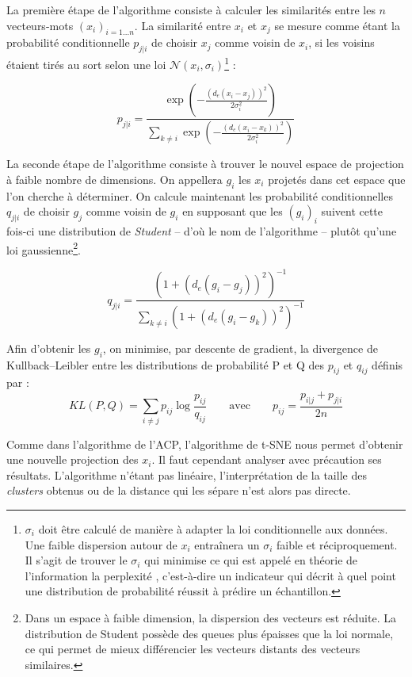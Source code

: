 \documentclass[11pt,french,french]{article}
\let\rmarkdownfootnote\footnote%
\def\footnote{\protect\rmarkdownfootnote}
\begin{document}
La première étape de l'algorithme consiste à calculer les similarités entre les \(n\) vecteurs-mots \((x_i)_{i=1...n}\). La similarité entre \(x_i\) et \(x_j\) se mesure comme étant la probabilité conditionnelle \(p_{j|i}\) de choisir \(x_j\) comme voisin de \(x_i\), si les voisins étaient tirés au sort selon une loi \(\mathcal{N}(x_i, \sigma_i)\)\footnote{\(\sigma_i\) doit être calculé de manière à adapter la loi conditionnelle aux données.
  Une faible dispersion autour de \(x_i\) entraînera un \(\sigma_i\) faible et réciproquement.
  Il s'agit de trouver le \(\sigma_i\) qui minimise ce qui est appelé en théorie de l'information la \og perplexité \fg{}, c'est-à-dire un indicateur qui décrit à quel point une distribution de probabilité réussit à prédire un échantillon.} :

\[ p_{j|i} = \frac{
\exp\left(-\frac{(d_e(x_i - x_j))^2}{2\sigma_i^2}\right)
}{
\sum_{k \neq i}
\exp\left(-\frac{(d_e(x_i - x_k))^2}{2\sigma_i^2}\right)
}\]

La seconde étape de l'algorithme consiste à trouver le nouvel espace de projection à faible nombre de dimensions.
On appellera \(g_i\) les \(x_i\) projetés dans cet espace que l'on cherche à déterminer.
On calcule maintenant les probabilité conditionnelles \(q_{j|i}\) de choisir \(g_j\) comme voisin de \(g_i\) en supposant que les \((g_i)_i\) suivent cette fois-ci une distribution de \emph{Student} -- d'où le nom de l'algorithme -- plutôt qu'une loi gaussienne\footnote{Dans un espace à faible dimension, la dispersion des vecteurs est réduite.
  La distribution de Student possède des queues plus épaisses que la loi normale, ce qui permet de mieux différencier les vecteurs distants des vecteurs similaires.}.

\[ q_{j|i} = \frac{(1+ (d_e(g_i - g_j))^2)^{-1}}{\sum_{k \neq i}{(1+ (d_e(g_i - g_k))^2)^{-1}}}\]

Afin d'obtenir les \(g_i\), on minimise, par descente de gradient, la divergence de Kullback--Leibler entre les distributions de probabilité P et Q des \(p_{ij}\) et \(q_{ij}\) définis par :
\[KL(P,Q) = \sum_{i \neq j} { p_{ij} \log{\frac{p_{ij}}{q_{ij}}}} \qquad\text{avec}\qquad p_{ij} = \frac{p_{i|j} + p_{j|i}}{2n}\]

Comme dans l'algorithme de l'ACP, l'algorithme de t-SNE nous permet d'obtenir une nouvelle projection des \(x_i\).
Il faut cependant analyser avec précaution ses résultats. L'algorithme n'étant pas linéaire, l'interprétation de la taille des \emph{clusters} obtenus ou de la distance qui les sépare n'est alors pas directe.
\end{document}
